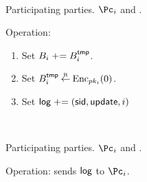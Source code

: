 \begin{protocol}~\label{prot:ConfidentialTransactions:Update}
	\item[Participating parties.] $\Pc_i$ and \Cc.
	
	\item Operation: \Cc 
	
	\begin{enumerate}
	\item Set $B_i  \mathrel{+}= B_i^{\mathsf{tmp}}$. 
	
	
	\item Set $B_i^{\mathsf{tmp}} \mathbin{\stackrel{\mbox{\tiny R}}{\leftarrow}} \operatorname{Enc}_{pk_i}(0)$.
	
	\item Set $\mathsf{log} \mathrel{+}= (\mathsf{sid},\mathsf{update},i)$
	
	
\end{enumerate}
	
\end{protocol}

\begin{protocol}~\label{prot:ConfidentialTransactions:History}
	\item[Participating parties.] $\Pc_i$ and \Cc.
		
	\item Operation: \Cc sends $\mathsf{log}$ to $\Pc_i$.
	
\end{protocol}

